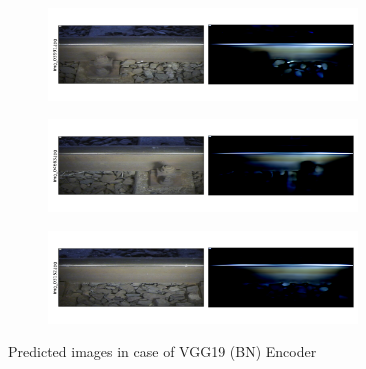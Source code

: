 \begin{figure}[!ht]
    \centering
    \begin{subfigure}{\textwidth}
        \centering
        \includegraphics[width=0.9\textwidth,trim={0 1cm 0 1cm},clip]{./results/vgg19_bn_vgg19/20230525_045131_predict_0.png}
    \end{subfigure}
    \begin{subfigure}{\textwidth}
        \centering
        \includegraphics[width=0.9\textwidth,trim={0 1cm 0 1cm},clip]{./results/vgg19_bn_vgg19/20230525_045131_predict_1.png}
    \end{subfigure}
    \begin{subfigure}{\textwidth}
        \centering
        \includegraphics[width=0.9\textwidth,trim={0 1cm 0 1cm},clip]{./results/vgg19_bn_vgg19/20230525_045131_predict_2.png}
    \end{subfigure}
    \caption{Predicted images in case of VGG19 (BN) Encoder}
    \label{fig:vgg19_bn_examples}
\end{figure}

